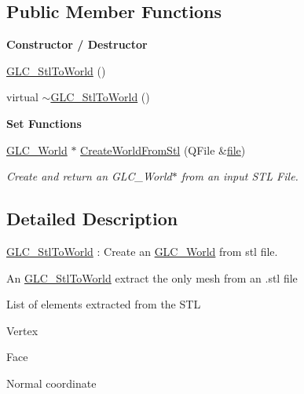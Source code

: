 \subsection*{Public Member Functions}
\begin{Indent}{\bf Constructor / Destructor}\par
\begin{DoxyCompactItemize}
\item 
\hyperlink{class_g_l_c___stl_to_world_afcb9fc9b170f58d1559f52393685f6dd}{G\-L\-C\-\_\-\-Stl\-To\-World} ()
\item 
virtual \hyperlink{class_g_l_c___stl_to_world_aa6f8c678eebdab0915136a1dff7b9dbc}{$\sim$\-G\-L\-C\-\_\-\-Stl\-To\-World} ()
\end{DoxyCompactItemize}
\end{Indent}
\begin{Indent}{\bf Set Functions}\par
\begin{DoxyCompactItemize}
\item 
\hyperlink{class_g_l_c___world}{G\-L\-C\-\_\-\-World} $\ast$ \hyperlink{class_g_l_c___stl_to_world_af9815c7d988ca86979b33400a610d306}{Create\-World\-From\-Stl} (Q\-File \&\hyperlink{uavobjecttemplate_8m_a97c04efa65bcf0928abf9260bc5cbf46}{file})
\begin{DoxyCompactList}\small\item\em Create and return an G\-L\-C\-\_\-\-World$\ast$ from an input S\-T\-L File. \end{DoxyCompactList}\end{DoxyCompactItemize}
\end{Indent}


\subsection{Detailed Description}
\hyperlink{class_g_l_c___stl_to_world}{G\-L\-C\-\_\-\-Stl\-To\-World} \-: Create an \hyperlink{class_g_l_c___world}{G\-L\-C\-\_\-\-World} from stl file. 

An \hyperlink{class_g_l_c___stl_to_world}{G\-L\-C\-\_\-\-Stl\-To\-World} extract the only mesh from an .stl file \par
 List of elements extracted from the S\-T\-L
\begin{DoxyItemize}
\item Vertex
\item Face
\item Normal coordinate 
\end{DoxyItemize}

